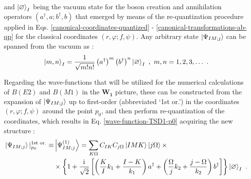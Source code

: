 and $\ket{\varnothing}_I$ being the vacuum state for the boson creation and annihilation operators $(a^\dagger,a;b^\dagger,b)$ that emerged by means of the re-quantization procedure applied in Eqs. \ref{canonical-coordinates-quantized} - \ref{canonical-transformations-ab-qp} for the classical coordinates $(r,\varphi;f,\psi)$. Any arbitrary state $\ket{\Psi_{IM;j}}$ can be spanned from the vacuum as \cite{raduta2017semiclassical}:
\begin{align}
    \ket{m,n}_I=\frac{1}{\sqrt{m!n!}}\left(a^\dagger\right)^m\left(b^\dagger\right)^n\ket{\varnothing}_I\ ,\ m,n=1,2,3,\dots\ .
\end{align}

Regarding the wave-functions that will be utilized for the numerical calculations of $B(E2)$ and $B(M1)$ in the $\mathbf{W_1}$ picture, these can be constructed from the expansion of $\ket{\Psi_{IM;j}}$ up to first-order (abbreviated `1st or.') in the coordinates $(r,\varphi;f,\psi)$ around the point $p_0$, and then perform re-quantization of the coordinates, which results in Eq. \ref{wave-function-TSD1-p0} acquiring the new structure \cite{raduta2017semiclassical,raduta2020approach,raduta2020towards}:
\begin{align}
    \ket{\Psi_{IM;j}}|_{p_0}^{\text{1st or.}}\equiv&\ket{\Psi_{IM;j}^{(1)}}=\sum_{K\Omega}C_{IK}C_{j\Omega}\ket{IMK}\ket{j\Omega}\times\nonumber\\
                           &\times\left\{1+\frac{\iu}{\sqrt{2}}\left[\left(\frac{K}{I}k_1+\frac{I-K}{k_1}\right)a^\dagger+\left(\frac{\Omega}{j}k_2+\frac{j-\Omega}{k_2}\right)b^\dagger\right]\right\}\ket{\varnothing}_I\ .
    \label{wave-function-TSD1-p0-first-order}
\end{align}

